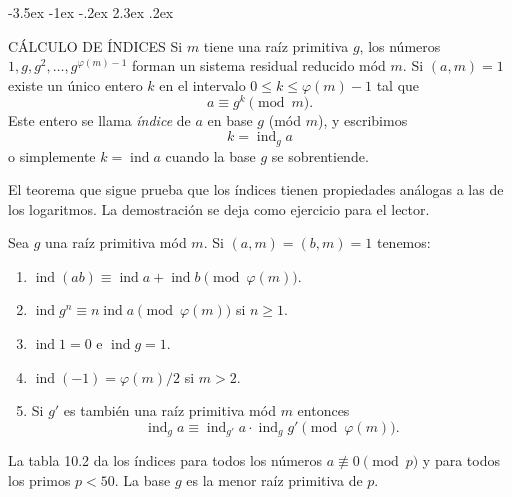 \documentclass[12pt,a4paper]{book}
\makeatletter
\renewcommand\section{\@startsection{section}{1}{\z@}%
  {-3.5ex \@plus -1ex \@minus -.2ex}%
  {2.3ex \@plus .2ex}%
  {\normalfont\Large\bfseries\raggedright}}
\makeatother
\begin{document}
    \section{CÁLCULO DE ÍNDICES}\label{sim:ind}
    Si $m$ tiene una raíz primitiva $g$, los números $1,g,g^{2},\dots,g^{\varphi(m)-1}$ forman
    un sistema residual reducido mód $m$. Si $(a,m)=1$ existe un único entero $k$ en el
    intervalo $0\leq k\leq\varphi(m)-1$ tal que
    \begin{equation*}
        a\equiv g^{k}\pmod{m}.
    \end{equation*}
    Este entero se llama \textit{índice} de $a$ en base $g$ (mód $m$), y escribimos
    \begin{equation*}
        k=\operatorname{ind}_{g}a
    \end{equation*}
    o simplemente $k=\operatorname{ind}a$ cuando la base $g$ se sobrentiende.

    El teorema que sigue prueba que los índices tienen propiedades análogas a las de los
    logaritmos. La demostración se deja como ejercicio para el lector.

    \begin{teorema}\label{teo:10-10}
        Sea $g$ una raíz primitiva mód $m$. Si $(a,m)=(b,m)=1$ tenemos:
        \begin{enumerate}
            \item[(a)] $\operatorname{ind}(ab)\equiv\operatorname{ind}a+\operatorname{ind}b\pmod{\varphi(m)}$.
            \item[(b)] $\operatorname{ind}g^{n}\equiv n\operatorname{ind}a\pmod{\varphi(m)}$ si $n\geq1$.
            \item[(c)] $\operatorname{ind}1=0$ e $\operatorname{ind}g=1$.
            \item[(d)] $\operatorname{ind}(-1)=\varphi(m)/2$ si $m>2$.
            \item[(e)] Si $g'$ es también una raíz primitiva mód $m$ entonces
            \begin{equation*}
                \operatorname{ind}_{g}a\equiv\operatorname{ind}_{g'}a\cdot\operatorname{ind}_{g}g'\pmod{\varphi(m)}.
            \end{equation*}
        \end{enumerate}
    \end{teorema}

    La tabla 10.2 da los índices para todos los números $a\not\equiv0\pmod{p}$ y para todos
    los primos $p<50$. La base $g$ es la menor raíz primitiva de $p$.
\end{document}
